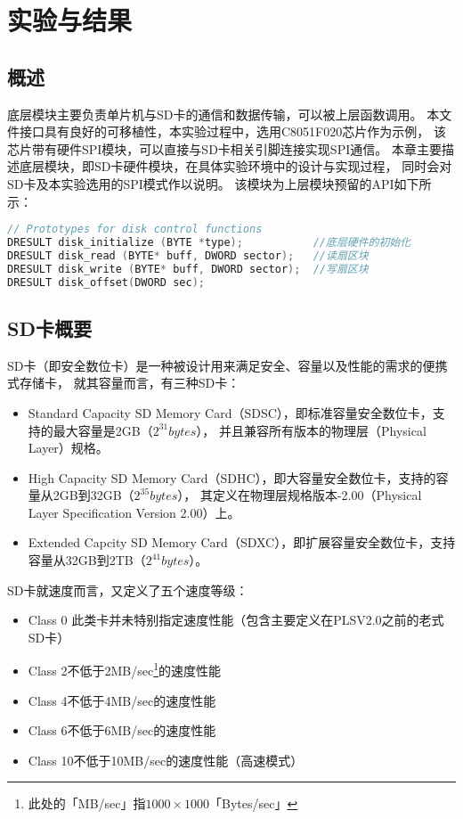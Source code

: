 
\chapter{实验与结果}
\label{chap:Results}

\section{概述}
\label{sec:sdcomments}
底层模块主要负责单片机与SD卡的通信和数据传输，可以被上层函数调用。
本文件接口具有良好的可移植性，本实验过程中，选用C8051F020芯片作为示例，
该芯片带有硬件SPI模块，可以直接与SD卡相关引脚连接实现SPI通信。
本章主要描述底层模块，即SD卡硬件模块，在具体实验环境中的设计与实现过程，
同时会对SD卡及本实验选用的SPI模式作以说明。
该模块为上层模块预留的API如下所示：
\begin{lstlisting}[language={C}, caption={底层模块API}]
// Prototypes for disk control functions
DRESULT disk_initialize (BYTE *type);           //底层硬件的初始化
DRESULT disk_read (BYTE* buff, DWORD sector);   //读扇区块
DRESULT disk_write (BYTE* buff, DWORD sector);  //写扇区块
DRESULT disk_offset(DWORD sec);
\end{lstlisting}

\section{SD卡概要}
\label{sec:sdinfo}
SD卡（即安全数位卡）是一种被设计用来满足安全、容量以及性能的需求的便携式存储卡，
就其容量而言，有三种SD卡：
\begin{itemize}[noitemsep,topsep=0pt,parsep=0pt,partopsep=0pt]
    \item Standard Capacity SD Memory Card（SDSC），即标准容量安全数位卡，支持的最大容量是2GB（$2^{31} bytes$），
        并且兼容所有版本的物理层（Physical Layer）规格。
    \item High Capacity SD Memory Card（SDHC），即大容量安全数位卡，支持的容量从2GB到32GB（$2^{35} bytes$），
        其定义在物理层规格版本-2.00（Physical Layer Specification Version 2.00）上。
    \item Extended Capcity SD Memory Card（SDXC），即扩展容量安全数位卡，支持容量从32GB到2TB（$2^{41} bytes$）。
\end{itemize}
\noindent SD卡就速度而言，又定义了五个速度等级：
\begin{itemize}[noitemsep,topsep=0pt,parsep=0pt,partopsep=0pt]
    \item Class 0 \quad 此类卡并未特别指定速度性能（包含主要定义在PLSV2.0之前的老式SD卡）
    \item Class 2\quad 不低于2MB/sec\footnote{此处的「MB/sec」指$1000\times1000$「Bytes/sec」}的速度性能
    \item Class 4\quad 不低于4MB/sec的速度性能
    \item Class 6\quad 不低于6MB/sec的速度性能
    \item Class 10\quad 不低于10MB/sec的速度性能（高速模式）
\end{itemize}

